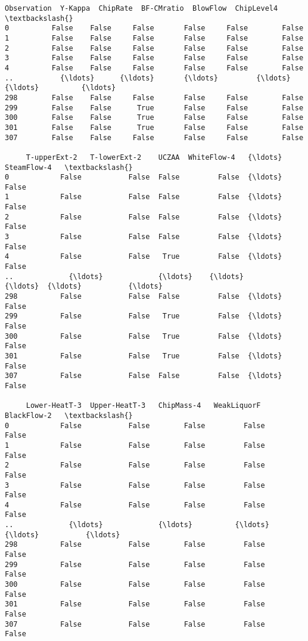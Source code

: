 \documentclass[11pt]{article}
\makeatletter
\newcommand{\boxspacing}{\kern\kvtcb@left@rule\kern\kvtcb@boxsep}
\newcommand{\prompt}[4]{
        {\ttfamily\llap{{\color{#2}[#3]:\hspace{3pt}#4}}\vspace{-\baselineskip}}
    }
\makeatother
\begin{document}
            \begin{tcolorbox}[breakable, size=fbox, boxrule=.5pt, pad at break*=1mm, opacityfill=0]
\prompt{Out}{outcolor}{8}{\boxspacing}
\begin{Verbatim}[commandchars=\\\{\}]
     Observation  Y-Kappa  ChipRate  BF-CMratio  BlowFlow  ChipLevel4   \textbackslash{}
0          False    False     False       False     False        False
1          False    False     False       False     False        False
2          False    False     False       False     False        False
3          False    False     False       False     False        False
4          False    False     False       False     False        False
..           {\ldots}      {\ldots}       {\ldots}         {\ldots}       {\ldots}          {\ldots}
298        False    False     False       False     False        False
299        False    False      True       False     False        False
300        False    False      True       False     False        False
301        False    False      True       False     False        False
307        False    False     False       False     False        False

     T-upperExt-2   T-lowerExt-2    UCZAA  WhiteFlow-4   {\ldots}  SteamFlow-4   \textbackslash{}
0            False           False  False         False  {\ldots}         False
1            False           False  False         False  {\ldots}         False
2            False           False  False         False  {\ldots}         False
3            False           False  False         False  {\ldots}         False
4            False           False   True         False  {\ldots}         False
..             {\ldots}             {\ldots}    {\ldots}           {\ldots}  {\ldots}           {\ldots}
298          False           False  False         False  {\ldots}         False
299          False           False   True         False  {\ldots}         False
300          False           False   True         False  {\ldots}         False
301          False           False   True         False  {\ldots}         False
307          False           False  False         False  {\ldots}         False

     Lower-HeatT-3  Upper-HeatT-3   ChipMass-4   WeakLiquorF   BlackFlow-2   \textbackslash{}
0            False           False        False         False         False
1            False           False        False         False         False
2            False           False        False         False         False
3            False           False        False         False         False
4            False           False        False         False         False
..             {\ldots}             {\ldots}          {\ldots}           {\ldots}           {\ldots}
298          False           False        False         False         False
299          False           False        False         False         False
300          False           False        False         False         False
301          False           False        False         False         False
307          False           False        False         False         False


\end{Verbatim}
\end{tcolorbox}
\end{document}
